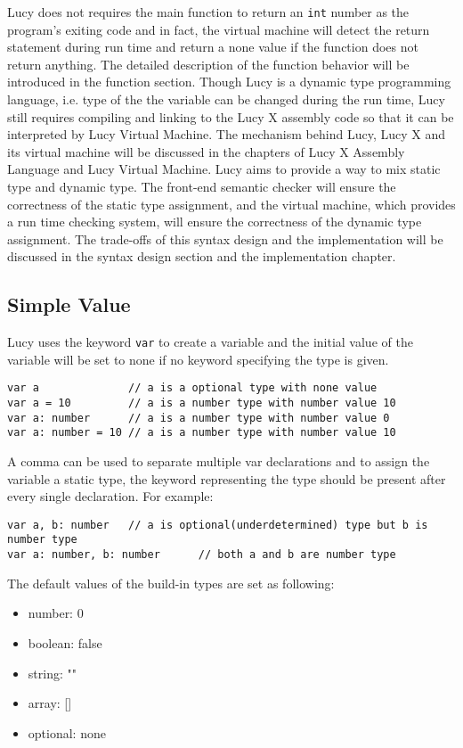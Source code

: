 Lucy does not requires the main function to return an \texttt{int} number as the program's exiting code and in fact, the virtual machine will detect the return statement during run time and return a none value if the function does not return anything. The detailed description of the function behavior will be introduced in the function section. Though Lucy is a dynamic type programming language, i.e. type of the the variable can be changed during the run time, Lucy still requires compiling and linking to the Lucy X assembly code so that it can be interpreted by Lucy Virtual Machine. The mechanism behind Lucy, Lucy X and its virtual machine will be discussed in the chapters of Lucy X Assembly Language and Lucy Virtual Machine. Lucy aims to provide a way to mix static type and dynamic type. The front-end semantic checker will ensure the correctness of the static type assignment, and the virtual machine, which provides a run time checking system, will ensure the correctness of the dynamic type assignment. The trade-offs of this syntax design and the implementation will be discussed in the syntax design section and the implementation chapter.

\subsection{Simple Value}
Lucy uses the keyword \texttt{var} to create a variable and the initial value of the variable will be set to none if no keyword specifying the type is given.
\begin{lstlisting}
var a              // a is a optional type with none value
var a = 10         // a is a number type with number value 10
var a: number      // a is a number type with number value 0
var a: number = 10 // a is a number type with number value 10
\end{lstlisting}
A comma can be used to separate multiple var declarations and to assign the variable a static type, the keyword representing the type should be present after every single declaration. For example:
\begin{lstlisting}
var a, b: number   // a is optional(underdetermined) type but b is number type
var a: number, b: number      // both a and b are number type
\end{lstlisting}
The default values of the build-in types are set as following:
\begin{itemize}
  \item number: 0
  \item boolean: false
  \item string: ""
  \item array: []
  \item optional: none
\end{itemize}

